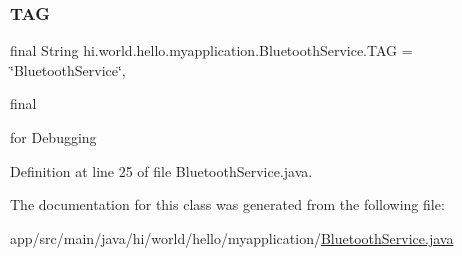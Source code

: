 \subsubsection{\texorpdfstring{TAG}{TAG}}
{\footnotesize\ttfamily final String hi.\+world.\+hello.\+myapplication.\+Bluetooth\+Service.\+T\+AG = \char`\"{}Bluetooth\+Service\char`\"{}\hspace{0.3cm}{\ttfamily [static]}, {\ttfamily [private]}}



final 

for Debugging 

Definition at line 25 of file Bluetooth\+Service.\+java.



The documentation for this class was generated from the following file\+:\begin{DoxyCompactItemize}
\item 
app/src/main/java/hi/world/hello/myapplication/\mbox{\hyperlink{_bluetooth_service_8java}{Bluetooth\+Service.\+java}}\end{DoxyCompactItemize}
